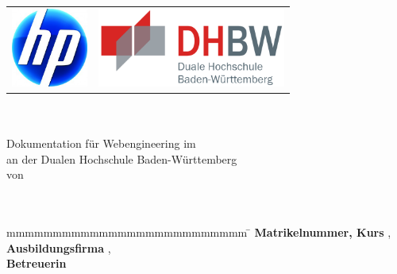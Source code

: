 \begin{titlepage}
	\begin{longtable}{p{} p{}}
	  {\includegraphics[height=2.6cm]{images/logo.png}} & 
	  {\includegraphics[height=2.6cm]{images/dhbw.png}}
	\end{longtable}
	\enlargethispage{20mm}
	\begin{center}
	  \vspace*{12mm}	{\LARGE\bf \titel }\\
	  \vspace*{12mm}	{\large\bf \arbeit}\\
	  \vspace*{12mm}	Dokumentation für Webengineering im \studiengang\\
	  \vspace*{3mm} 	an der Dualen Hochschule Baden-Württemberg \dhbw\\
	  \vspace*{12mm}	von\\
	  \vspace*{3mm} 	{\large\bf \autor}\\
	  \vspace*{12mm}	\datumAbgabe\\
	\end{center}
	\vfill
	\begin{spacing}{1.2}
	\begin{tabbing}
		mmmmmmmmmmmmmmmmmmmmmmmmmm     \= \kill
		\textbf{Matrikelnummer, Kurs}  \>  \martrikelnr, \kurs\\
		\textbf{Ausbildungsfirma}      \>  \firma, \firmenort\\
		\textbf{Betreuerin}              \>  \betreuer\\
	\end{tabbing}
	\end{spacing}
\end{titlepage}
